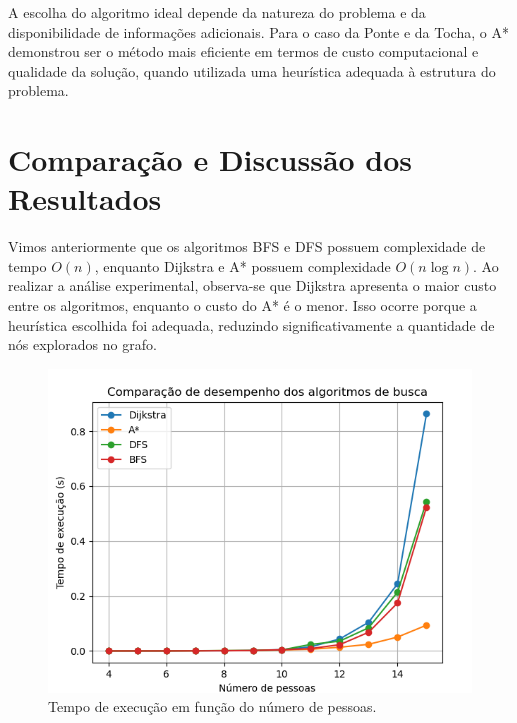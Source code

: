 \documentclass[12pt,a4paper]{article}
\begin{document}
A escolha do algoritmo ideal depende da natureza do problema e da disponibilidade de informações adicionais. 
Para o caso da Ponte e da Tocha, o A* demonstrou ser o método mais eficiente em termos de custo computacional e qualidade da solução, quando utilizada uma heurística adequada à estrutura do problema.

\section{Comparação e Discussão dos Resultados}

Vimos anteriormente que os algoritmos BFS e DFS possuem complexidade de tempo $O(n)$, enquanto Dijkstra e A* possuem complexidade $O(n \log n)$. Ao realizar a análise experimental, observa-se que Dijkstra apresenta o maior custo entre os algoritmos, enquanto o custo do A* é o menor. Isso ocorre porque a heurística escolhida foi adequada, reduzindo significativamente a quantidade de nós explorados no grafo.

\begin{figure}[H]
    \centering
    \includegraphics[width=0.8\linewidth]{execution_time.png}
    \caption{Tempo de execução em função do número de pessoas.}
    \label{fig:execution_time}
\end{figure}
\end{document}
